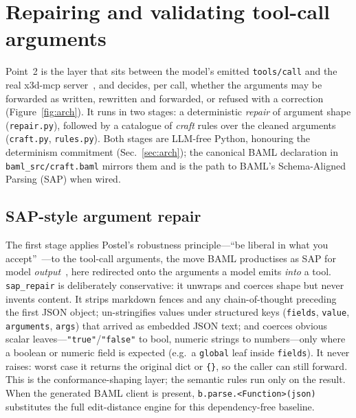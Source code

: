 \documentclass[sigconf,nonacm,screen,anonymous]{acmart}
\begin{document}
\section{Repairing and validating tool-call arguments}\label{sec:point2}

Point~2 is the layer that sits between the model's emitted \texttt{tools/call} and the real x3d-mcp server~\cite{mcp}, and decides, per call, whether the arguments may be forwarded as written, rewritten and forwarded, or refused with a correction (Figure~\ref{fig:arch}). It runs in two stages: a deterministic \emph{repair} of argument shape (\texttt{repair.py}), followed by a catalogue of \emph{craft} rules over the cleaned arguments (\texttt{craft.py}, \texttt{rules.py}). Both stages are LLM-free Python, honouring the determinism commitment (Sec.~\ref{sec:arch}); the canonical BAML declaration in \texttt{baml\_src/craft.baml} mirrors them and is the path to BAML's Schema-Aligned Parsing (SAP) when wired.

\subsection{SAP-style argument repair}
The first stage applies Postel's robustness principle---``be liberal in what you accept''~\cite{postel}---to the tool-call arguments, the move BAML productises as SAP for model \emph{output}~\cite{baml}, here redirected onto the arguments a model emits \emph{into} a tool. \texttt{sap\_repair} is deliberately conservative: it unwraps and coerces shape but never invents content. It strips markdown fences and any chain-of-thought preceding the first JSON object; un-stringifies values under structured keys (\texttt{fields}, \texttt{value}, \texttt{arguments}, \texttt{args}) that arrived as embedded JSON text; and coerces obvious scalar leaves---\texttt{"true"}/\texttt{"false"} to bool, numeric strings to numbers---only where a boolean or numeric field is expected (e.g.\ a \texttt{global} leaf inside \texttt{fields}). It never raises: worst case it returns the original dict or \texttt{\{\}}, so the caller can still forward. This is the conformance-shaping layer; the semantic rules run only on the result. When the generated BAML client is present, \texttt{b.parse.<Function>(json)} substitutes the full edit-distance engine for this dependency-free baseline.
\end{document}
